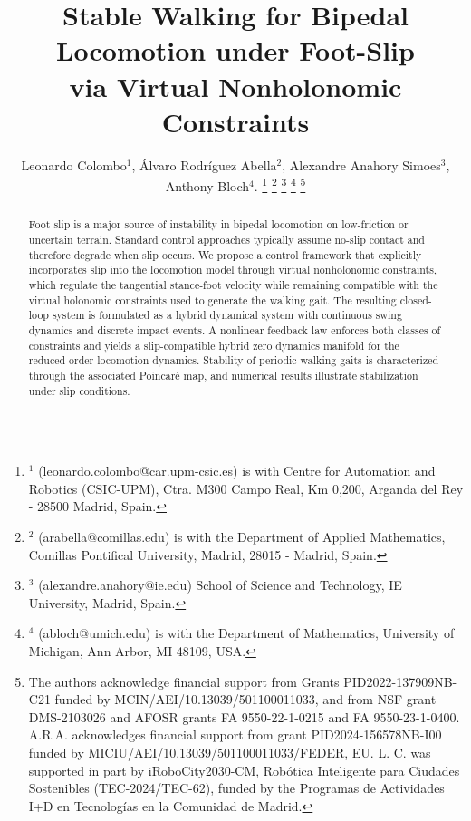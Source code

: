 \documentclass[letterpaper, 10 pt, conference]{ieeeconf}
\begin{document}
\title{Stable Walking for Bipedal Locomotion under Foot-Slip\\ via Virtual Nonholonomic Constraints}

\author{ Leonardo Colombo$^{1}$, \'Alvaro Rodr\'iguez Abella$^{2}$, Alexandre Anahory Simoes$^{3}$, Anthony Bloch$^{4}$. 
\thanks{$^{1}$ (leonardo.colombo@car.upm-csic.es) is with Centre for Automation and Robotics (CSIC-UPM), Ctra. M300 Campo Real, Km 0,200, Arganda
del Rey - 28500 Madrid, Spain.}
\thanks{$^{2}$ (arabella@comillas.edu) is with the Department of Applied Mathematics, Comillas Pontifical University, Madrid, 28015 - Madrid, Spain.}
\thanks{$^{3}$ (alexandre.anahory@ie.edu) School of Science and Technology, IE University, Madrid, Spain.}
\thanks{$^{4}$ (abloch@umich.edu) is with the Department of Mathematics, University of Michigan, Ann Arbor, MI 48109, USA.}
\thanks{The authors acknowledge financial support from Grants  PID2022-137909NB-C21 funded by MCIN/AEI/10.13039/501100011033, and from  NSF grant  DMS-2103026 and AFOSR grants FA
9550-22-1-0215 and FA 9550-23-1-0400. A.R.A. acknowledges financial support from grant PID2024-156578NB-I00 funded by MICIU/AEI/10.13039/501100011033/FEDER, EU. L. C. was supported in part by iRoboCity2030-CM, Robótica Inteligente para Ciudades Sostenibles (TEC-2024/TEC-62), funded by the Programas de Actividades I+D en Tecnologías en la Comunidad de Madrid.
}}%

\maketitle
\begin{abstract}
Foot slip is a major source of instability in bipedal locomotion on low-friction or uncertain terrain. Standard control approaches typically assume no-slip contact and therefore degrade when slip occurs. We propose a control framework that explicitly incorporates slip into the locomotion model through virtual nonholonomic constraints, which regulate the tangential stance-foot velocity while remaining compatible with the virtual holonomic constraints used to generate the walking gait. The resulting closed-loop system is formulated as a hybrid dynamical system with continuous swing dynamics and discrete impact events. A nonlinear feedback law enforces both classes of constraints and yields a slip-compatible hybrid zero dynamics manifold for the reduced-order locomotion dynamics. Stability of periodic walking gaits is characterized through the associated Poincaré map, and numerical results illustrate stabilization under slip conditions.
\end{abstract}
\end{document}
